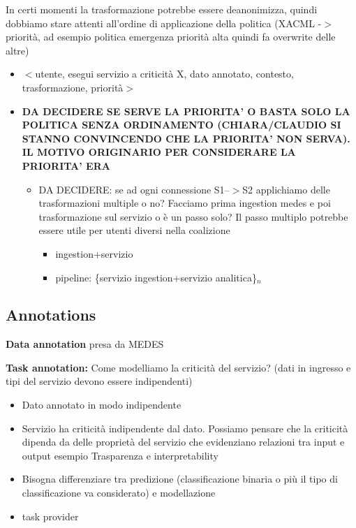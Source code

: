 \documentclass[10pt,journal,compsoc]{IEEEtran}
\begin{document}
In certi momenti la trasformazione potrebbe essere deanonimizza, quindi dobbiamo stare attenti all’ordine di applicazione della politica (XACML -$>$ priorità, ad esempio politica emergenza priorità alta quindi fa overwrite delle altre)
\begin{itemize}
    \item $<$utente, esegui servizio a criticità X, dato annotato, contesto, trasformazione, priorità$>$
    \item \textbf{DA DECIDERE SE SERVE LA PRIORITA’ O BASTA SOLO LA POLITICA SENZA ORDINAMENTO (CHIARA/CLAUDIO SI STANNO CONVINCENDO CHE LA PRIORITA’ NON SERVA). IL MOTIVO ORIGINARIO PER CONSIDERARE LA PRIORITA’ ERA}
    \begin{itemize}
        \item DA DECIDERE: se ad ogni connessione S1--$>$S2 applichiamo delle trasformazioni multiple o no? Facciamo prima ingestion medes e poi trasformazione sul servizio o è un passo solo? Il passo multiplo potrebbe essere utile per utenti diversi nella coalizione
        \begin{itemize}
            \item ingestion+servizio
            \item pipeline:  \{servizio ingestion+servizio analitica\}$_n$
        \end{itemize}
    \end{itemize}
\end{itemize}


\subsection{Annotations}
\textbf{Data annotation} presa da MEDES

\textbf{Task annotation:} Come modelliamo la criticità del servizio? (dati in ingresso e tipi del servizio devono essere indipendenti)
\begin{itemize}
    \item Dato annotato in modo indipendente
    \item Servizio ha criticità indipendente dal dato. Possiamo pensare che la criticità dipenda da delle proprietà del servizio che evidenziano relazioni tra input e output esempio Trasparenza e interpretability 
    \item Bisogna differenziare tra predizione (classificazione binaria o più il tipo di classificazione va considerato) e modellazione
    \item task provider
\end{itemize}
\end{document}
